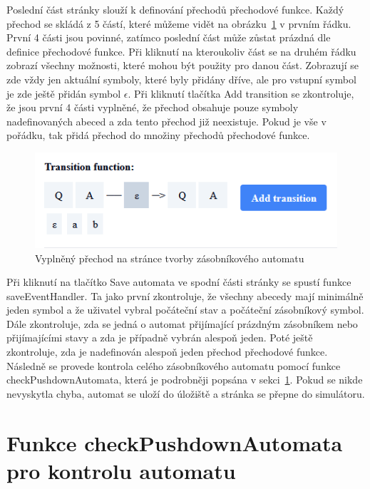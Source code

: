 Poslední část stránky slouží k definování přechodů přechodové funkce. Každý přechod se skládá z 5 částí, které můžeme vidět na obrázku~\ref{fig:FilledTransition} v prvním řádku. První 4 části jsou povinné, zatímco poslední část může zůstat prázdná dle definice přechodové funkce. Při kliknutí na kteroukoliv část se na druhém řádku zobrazí všechny možnosti, které mohou být použity pro danou část. Zobrazují se zde vždy jen aktuální symboly, které byly přidány dříve, ale pro vstupní symbol je zde ještě přidán symbol $\epsilon$. Při kliknutí tlačítka Add transition se zkontroluje, že jsou první 4 části vyplněné, že přechod obsahuje pouze symboly nadefinovaných abeced a zda tento přechod již neexistuje. Pokud je vše v pořádku, tak přidá přechod do množiny přechodů přechodové funkce.

\begin{figure}[h]
    \centering
    \includegraphics{Figures/PrntScrn_FilledTransition.png}
    \caption{Vyplněný přechod na stránce tvorby zásobníkového automatu}\label{fig:FilledTransition}
\end{figure}

Při kliknutí na tlačítko Save automata ve spodní části stránky se spustí funkce saveEventHandler. Ta jako první zkontroluje, že všechny abecedy mají minimálně jeden symbol a že uživatel vybral počáteční stav a počáteční zásobníkový symbol. Dále zkontroluje, zda se jedná o automat přijímající prázdným zásobníkem nebo přijímajícími stavy a zda je případně vybrán alespoň jeden. Poté ještě zkontroluje, zda je nadefinován alespoň jeden přechod přechodové funkce. Následně se provede kontrola celého zásobníkového automatu pomocí funkce checkPushdownAutomata, která je podrobněji popsána v sekci~\ref{sec:checkPushdownAutomata}. Pokud se nikde nevyskytla chyba, automat se uloží do úložiště a stránka se přepne do simulátoru.

\section{Funkce checkPushdownAutomata pro kontrolu automatu}\label{sec:checkPushdownAutomata}

